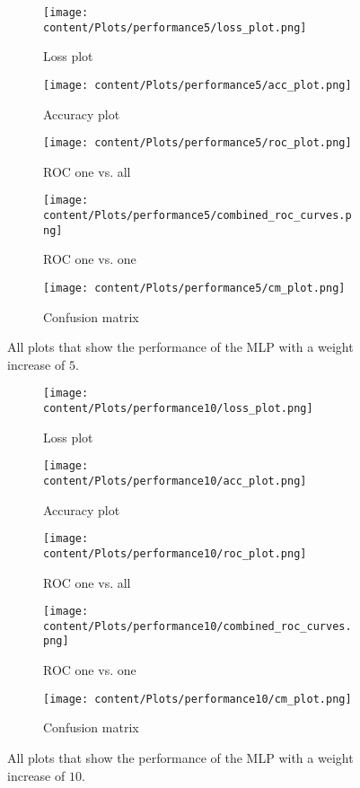\begin{figure}[htbp]
    \centering
    \begin{subfigure}{0.45\textwidth}
        \centering
        \texttt{[image: content/Plots/performance5/loss\_plot.png]}
        \caption{Loss plot}
    \end{subfigure}
    \hfill
    \begin{subfigure}{0.45\textwidth}
        \centering
        \texttt{[image: content/Plots/performance5/acc\_plot.png]}
        \caption{Accuracy plot}
    \end{subfigure}
    \begin{subfigure}{0.45\textwidth}
        \centering
        \texttt{[image: content/Plots/performance5/roc\_plot.png]}
        \caption{ROC one vs. all}
    \end{subfigure}
    \begin{subfigure}{0.45\textwidth}
        \centering
        \texttt{[image: content/Plots/performance5/combined\_roc\_curves.png]}
        \caption{ROC one vs. one}
    \end{subfigure}
    \begin{subfigure}{0.45\textwidth}
        \centering
        \texttt{[image: content/Plots/performance5/cm\_plot.png]}
        \caption{Confusion matrix}
    \end{subfigure}
    \caption{All plots that show the performance of the MLP with a weight increase of $5$.}
\end{figure}

\begin{figure}[htbp]
    \centering
    \begin{subfigure}{0.45\textwidth}
        \centering
        \texttt{[image: content/Plots/performance10/loss\_plot.png]}
        \caption{Loss plot}
    \end{subfigure}
    \hfill
    \begin{subfigure}{0.45\textwidth}
        \centering
        \texttt{[image: content/Plots/performance10/acc\_plot.png]}
        \caption{Accuracy plot}
    \end{subfigure}
    \begin{subfigure}{0.45\textwidth}
        \centering
        \texttt{[image: content/Plots/performance10/roc\_plot.png]}
        \caption{ROC one vs. all}
    \end{subfigure}
    \begin{subfigure}{0.45\textwidth}
        \centering
        \texttt{[image: content/Plots/performance10/combined\_roc\_curves.png]}
        \caption{ROC one vs. one}
    \end{subfigure}
    \begin{subfigure}{0.45\textwidth}
        \centering
        \texttt{[image: content/Plots/performance10/cm\_plot.png]}
        \caption{Confusion matrix}
    \end{subfigure}
    \caption{All plots that show the performance of the MLP with a weight increase of $10$.}
\end{figure}


